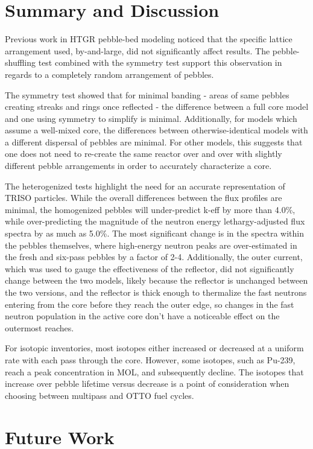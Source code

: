 \section{Summary and Discussion}

Previous work in HTGR pebble-bed modeling noticed that the specific lattice arrangement used, by-and-large, did not significantly affect results.  The pebble-shuffling test combined with the symmetry test support this observation in regards to a completely random arrangement of pebbles.

The symmetry test showed that for minimal banding - areas of same pebbles creating streaks and rings once reflected - the difference between a full core model and one using symmetry to simplify is minimal.  Additionally, for models which assume a well-mixed core, the differences between otherwise-identical models with a different dispersal of pebbles are minimal.  For other models, this suggests that one does not need to re-create the same reactor over and over with slightly different pebble arrangements in order to accurately characterize a core.

The heterogenized tests highlight the need for an accurate representation of TRISO particles.  While the overall differences between the flux profiles are minimal, the homogenized pebbles will under-predict k-eff by more than 4.0\%, while over-predicting the magnitude of the neutron energy lethargy-adjusted flux spectra by as much as 5.0\%.  The most significant change is in the spectra within the pebbles themselves, where high-energy neutron peaks are over-estimated in the fresh and six-pass pebbles by a factor of 2-4.  Additionally, the outer current, which was used to gauge the effectiveness of the reflector, did not significantly change between the two models, likely because the reflector is unchanged between the two versions, and the reflector is thick enough to thermalize the fast neutrons entering from the core before they reach the outer edge, so changes in the fast neutron population in the active core don't have a noticeable effect on the outermost reaches.

For isotopic inventories, most isotopes either increased or decreased at a uniform rate with each pass through the core.  However, some isotopes, such as Pu-239, reach a peak concentration in MOL, and subsequently decline.  The isotopes that increase over pebble lifetime versus decrease is a point of consideration when choosing between multipass and OTTO fuel cycles.


\section{Future Work}

